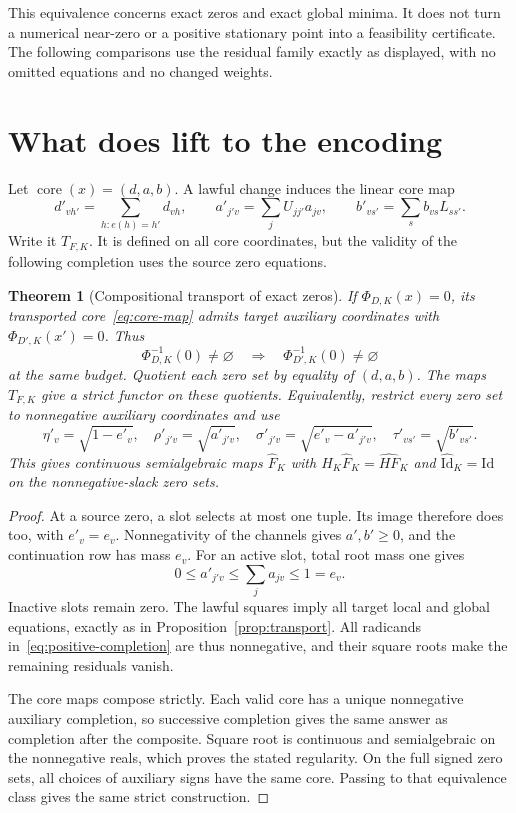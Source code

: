 \documentclass[11pt]{article}
\newcommand{\Id}{\mathrm{Id}}
\newcommand{\core}{\operatorname{core}}
\newtheorem{theorem}{Theorem}[section]
\theoremstyle{remark}
\begin{document}
This equivalence concerns exact zeros and exact global minima. It does not turn a numerical near-zero or a positive stationary point into a feasibility certificate. The following comparisons use the residual family exactly as displayed, with no omitted equations and no changed weights.

\section{What does lift to the encoding}\label{sec:zero-lift}
Let $\core(x)=(d,a,b)$. A lawful change induces the linear core map
\begin{equation}\label{eq:core-map}
 d'_{vh'}=\sum_{h:e(h)=h'}d_{vh},\qquad
 a'_{j'v}=\sum_jU_{jj'}a_{jv},\qquad
 b'_{vs'}=\sum_sb_{vs}L_{ss'}.
\end{equation}
Write it $T_{F,K}$. It is defined on all core coordinates, but the validity of the following completion uses the source zero equations.

\begin{theorem}[Compositional transport of exact zeros]\label{thm:zero-lift}
If $\Phi_{D,K}(x)=0$, its transported core~\eqref{eq:core-map} admits target auxiliary coordinates with $\Phi_{D',K}(x')=0$. Thus
\[
 \Phi_{D,K}^{-1}(0)\ne\varnothing
 \quad\Longrightarrow\quad
 \Phi_{D',K}^{-1}(0)\ne\varnothing
\]
at the same budget. Quotient each zero set by equality of $(d,a,b)$. The maps $T_{F,K}$ give a strict functor on these quotients. Equivalently, restrict every zero set to nonnegative auxiliary coordinates and use
\begin{equation}\label{eq:positive-completion}
 \eta'_v=\sqrt{1-e'_v},\quad
 \rho'_{j'v}=\sqrt{a'_{j'v}},\quad
 \sigma'_{j'v}=\sqrt{e'_v-a'_{j'v}},\quad
 \tau'_{vs'}=\sqrt{b'_{vs'}}.
\end{equation}
This gives continuous semialgebraic maps $\widehat F_K$ with
$\widehat H_K\widehat F_K=\widehat{HF}_K$ and $\widehat{\Id}_K=\Id$ on the nonnegative-slack zero sets.
\end{theorem}
\begin{proof}
At a source zero, a slot selects at most one tuple. Its image therefore does too, with $e'_v=e_v$. Nonnegativity of the channels gives $a',b'\ge0$, and the continuation row has mass $e_v$. For an active slot, total root mass one gives
\[
 0\le a'_{j'v}\le\sum_ja_{jv}\le1=e_v.
\]
Inactive slots remain zero. The lawful squares imply all target local and global equations, exactly as in Proposition~\ref{prop:transport}. All radicands in~\eqref{eq:positive-completion} are thus nonnegative, and their square roots make the remaining residuals vanish.

The core maps compose strictly. Each valid core has a unique nonnegative auxiliary completion, so successive completion gives the same answer as completion after the composite. Square root is continuous and semialgebraic on the nonnegative reals, which proves the stated regularity. On the full signed zero sets, all choices of auxiliary signs have the same core. Passing to that equivalence class gives the same strict construction.
\end{proof}
\end{document}
